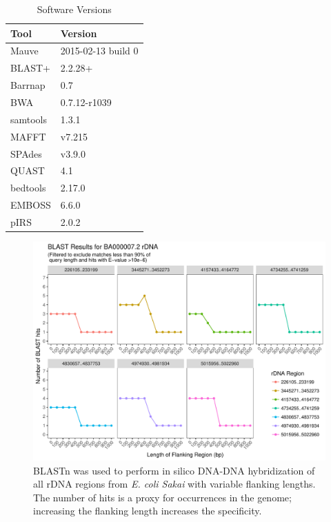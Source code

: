 \documentclass[10pt]{article}
\begin{document}
\begin{table}[]
  \centering
  \caption{Software Versions}
  \label{table:software}
  \begin{tabular}{ll}
    \toprule
    Tool & Version \\
    \midrule
    Mauve & 2015-02-13 build 0 \\
    BLAST+ & 2.2.28+ \\
    Barrnap & 0.7 \\
    BWA & 0.7.12-r1039 \\
    samtools & 1.3.1 \\
    MAFFT & v7.215 \\
    SPAdes & v3.9.0 \\
    QUAST & 4.1 \\
    bedtools & 2.17.0 \\
    EMBOSS & 6.6.0 \\
    pIRS & 2.0.2\\
    \bottomrule
  \end{tabular}
\end{table}

\pagebreak

\begin{figure}[!h]
    \centering
    \hspace*{0cm}\includegraphics[width=.8\textwidth]{sakai_BLAST_results}
    \caption{BLASTn was used to perform in silico DNA-DNA hybridization of all rDNA regions from \textit{E. coli Sakai} with variable flanking lengths. The number of hits is a proxy for occurrences in the genome; increasing the flanking length increases the specificity.}
    \label{fig:blast}
  \end{figure}
\end{document}
